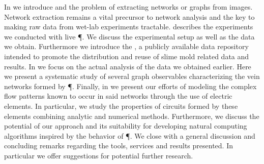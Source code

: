 	In  we introduce \NEFI and the problem of extracting networks or graphs from images. Network extraction remains a vital precursor to network analysis and the key to making raw data from wet-lab experiments tractable.  describes the experiments we conducted with live \P. We discuss the experimental setup as well as the data we obtain. Furthermore we introduce the \SMGR, a publicly available data repository intended to promote the distribution and reuse of slime mold related data and results. In  we focus on the actual analysis of the data we obtained earlier. Here we present a systematic study of several graph observables characterizing the vein networks formed by \P. Finally, in  we present our efforts of modeling the complex flow patterns known to occur in said networks through the use of electric elements. In particular, we study the properties of circuits formed by these elements combining analytic and numerical methods. Furthermore, we discuss the potential of our approach and its suitability for developing natural computing algorithms inspired by the behavior of \P. %
	We close with a general discussion and concluding remarks regarding the tools, services and results presented. In particular we offer suggestions for potential further research.












